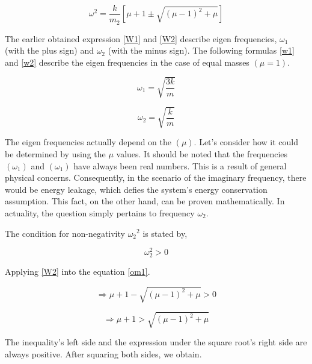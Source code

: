 \begin{equation}
\label{W2}
  {\omega ^2}  = \frac{k}{{{m_2}}}\left[ {\mu  + 1 \pm \sqrt {{{\left( {\mu  - 1} \right)}^2} + \mu } } \right]
\end{equation}

The  earlier obtained expression \eqref{W1} and \eqref{W2} describe  eigen frequencies, ${\omega _1}$ (with the plus sign) and ${\omega _2}$ (with the minus sign). The following  formulas \eqref{w1} and \eqref{w2} describe  the eigen frequencies in the case of equal masses $\left( {\mu  = 1} \right)$.  


\begin{equation}
\label{w1}
    {\omega _1} = \sqrt {\frac{{3k}}{m}} 
\end{equation}

\begin{equation}
\label{w2}
    {\omega _2} = \sqrt {\frac{k}{m}} 
\end{equation}



The eigen frequencies actually depend on the $\left( {\mu } \right)$. Let's consider how it could be determined by using the $\mu$ values. It should be noted that the frequencies $(\omega_1 )$ and $(\omega_1 )$ have always been real numbers. This is a result of general physical concerns. Consequently, in the scenario of the imaginary frequency, there would be energy leakage, which defies the system's energy conservation assumption. This fact, on the other hand, can be proven mathematically. In actuality, the question simply pertains to frequency $\omega_2$.



The condition for non-negativity ${\omega _2}^2$ is stated by, 

\begin{equation}
\label{om1}
   \omega _2^2 > 0
\end{equation}

Applying \eqref{W2} into the equation \eqref{om1}.

\begin{equation}
\Rightarrow \mu + 1 - \sqrt {{{\left( {\mu - 1} \right)}^2} + \mu } > 0 
\end{equation}

\begin{equation}
    \Rightarrow \mu + 1 > \sqrt {{{\left( {\mu - 1} \right)}^2} + \mu}  
\end{equation}

The inequality's left side and the expression under the square root's right side are always positive. After squaring both sides, we obtain. 


